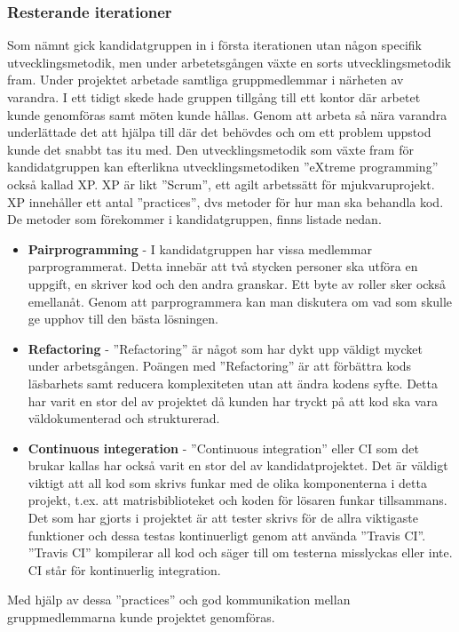 \subsubsection{Resterande iterationer}
Som nämnt gick kandidatgruppen in i första iterationen utan någon specifik utvecklingsmetodik, men under arbetetsgången växte en sorts utvecklingsmetodik fram.
\newline
\newline
Under projektet arbetade samtliga gruppmedlemmar i närheten av varandra. I ett tidigt skede hade gruppen tillgång till ett kontor där arbetet kunde genomföras samt möten kunde hållas. Genom att arbeta så nära varandra underlättade det att hjälpa till där det behövdes och om ett problem uppstod kunde det snabbt tas itu med.
\newline
\newline
Den utvecklingsmetodik som växte fram för kandidatgruppen kan efterlikna utvecklingsmetodiken ''eXtreme programming'' också kallad XP. XP är likt ''Scrum'', ett agilt arbetssätt för mjukvaruprojekt. XP innehåller ett antal ''practices'', dvs metoder för hur man ska behandla kod. De metoder som förekommer i kandidatgruppen, finns listade nedan.
\begin{itemize}
  \item \textbf{Pairprogramming} - I kandidatgruppen har vissa medlemmar parprogrammerat. Detta innebär att två stycken personer ska utföra en uppgift, en skriver kod och den andra granskar. Ett byte av roller sker också emellanåt. Genom att parprogrammera kan man diskutera om vad som skulle ge upphov till den bästa lösningen.
  \item \textbf{Refactoring} - ''Refactoring'' är något som har dykt upp väldigt mycket under arbetsgången. Poängen med ''Refactoring'' är att förbättra kods läsbarhets samt reducera komplexiteten utan att ändra kodens syfte. Detta har varit en stor del av projektet då kunden har tryckt på att kod ska vara väldokumenterad och strukturerad.
  \item \textbf{Continuous integeration} - ''Continuous integration'' eller CI som det brukar kallas har också varit en stor del av kandidatprojektet. Det är väldigt viktigt att all kod som skrivs funkar med de olika komponenterna i detta projekt, t.ex. att matrisbiblioteket och koden för lösaren funkar tillsammans. Det som har gjorts i projektet är att tester skrivs för de allra viktigaste funktioner och dessa testas kontinuerligt genom att använda ''Travis CI''. ''Travis CI'' kompilerar all kod och säger till om testerna misslyckas eller inte. CI står för kontinuerlig integration.
\end{itemize}
Med hjälp av dessa ''practices'' och god kommunikation mellan gruppmedlemmarna kunde projektet genomföras. 

